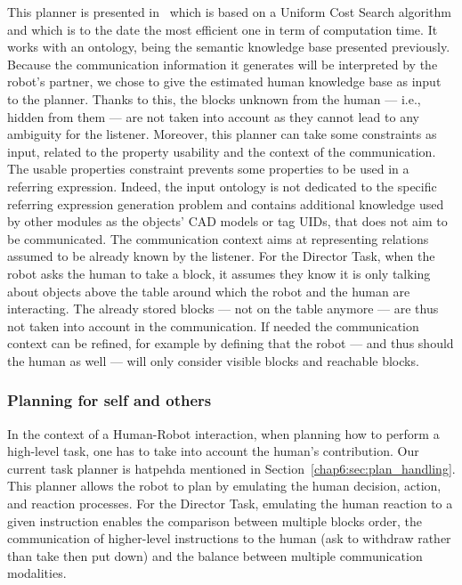 \documentclass[a4paper,11pt,twoside]{StyleThese}
\begin{document}
This planner is presented in~\citep{buisan_2020_efficient} which is based on a Uniform Cost Search algorithm and which is to the date the most efficient one in term of computation time. It works with an ontology, being the semantic knowledge base presented previously. Because the communication information it generates will be interpreted by the robot's partner, we chose to give the estimated human knowledge base as input to the planner. Thanks to this, the blocks unknown from the human --- i.e., hidden from them --- are not taken into account as they cannot lead to any ambiguity for the listener. Moreover, this planner can take some constraints as input, related to the property usability and the context of the communication. The usable properties constraint prevents some properties to be used in a referring expression. Indeed, the input ontology is not dedicated to the specific referring expression generation problem and contains additional knowledge used by other modules as the objects' CAD models or tag UIDs, that does not aim to be communicated. The communication context aims at representing relations assumed to be already known by the listener. For the Director Task, when the robot asks the human to take a block, it assumes they know it is only talking about objects above the table around which the robot and the human are interacting. The already stored blocks --- not on the table anymore --- are thus not taken into account in the communication. If needed the communication context can be refined, for example by defining that the robot --- and thus should the human as well --- will only consider visible blocks and reachable blocks.

\subsubsection{Planning for self and others}

In the context of a Human-Robot interaction, when planning how to perform a high-level task, one has to take into account the human's contribution. Our current task planner is \acrshort{hatpehda} mentioned in Section~\ref{chap6:sec:plan_handling}. This planner allows the robot to plan by emulating the human decision, action, and reaction processes. For the Director Task, emulating the human reaction to a given instruction enables the comparison between multiple blocks order, the communication of higher-level instructions to the human (\eg ask to withdraw rather than take then put down) and the balance between multiple communication modalities.
\end{document}
